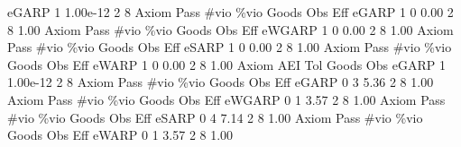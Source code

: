        eGARP {\VBAR}         1   1.00e-12          2          8 
{\smallskip}
{\smallskip}
{\smallskip}
       Axiom {\VBAR} Pass        \#vio        \%vio       Goods         Obs         Eff  
       eGARP {\VBAR}    1           0        0.00           2           8        1.00  
{\smallskip}
{\smallskip}
{\smallskip}
       Axiom {\VBAR} Pass        \#vio        \%vio       Goods         Obs         Eff  
      eWGARP {\VBAR}    1           0        0.00           2           8        1.00  
{\smallskip}
{\smallskip}
{\smallskip}
       Axiom {\VBAR} Pass        \#vio        \%vio       Goods         Obs         Eff  
       eSARP {\VBAR}    1           0        0.00           2           8        1.00  
{\smallskip}
{\smallskip}
{\smallskip}
       Axiom {\VBAR} Pass        \#vio        \%vio       Goods         Obs         Eff  
       eWARP {\VBAR}    1           0        0.00           2           8        1.00  
{\smallskip}
       Axiom {\VBAR}       AEI        Tol      Goods        Obs 
       eGARP {\VBAR}         1   1.00e-12          2          8 
{\smallskip}
{\smallskip}
{\smallskip}
       Axiom {\VBAR} Pass        \#vio        \%vio       Goods         Obs         Eff  
       eGARP {\VBAR}    0           3        5.36           2           8        1.00  
{\smallskip}
{\smallskip}
{\smallskip}
       Axiom {\VBAR} Pass        \#vio        \%vio       Goods         Obs         Eff  
      eWGARP {\VBAR}    0           1        3.57           2           8        1.00  
{\smallskip}
{\smallskip}
{\smallskip}
       Axiom {\VBAR} Pass        \#vio        \%vio       Goods         Obs         Eff  
       eSARP {\VBAR}    0           4        7.14           2           8        1.00  
{\smallskip}
{\smallskip}
{\smallskip}
       Axiom {\VBAR} Pass        \#vio        \%vio       Goods         Obs         Eff  
       eWARP {\VBAR}    0           1        3.57           2           8        1.00  
